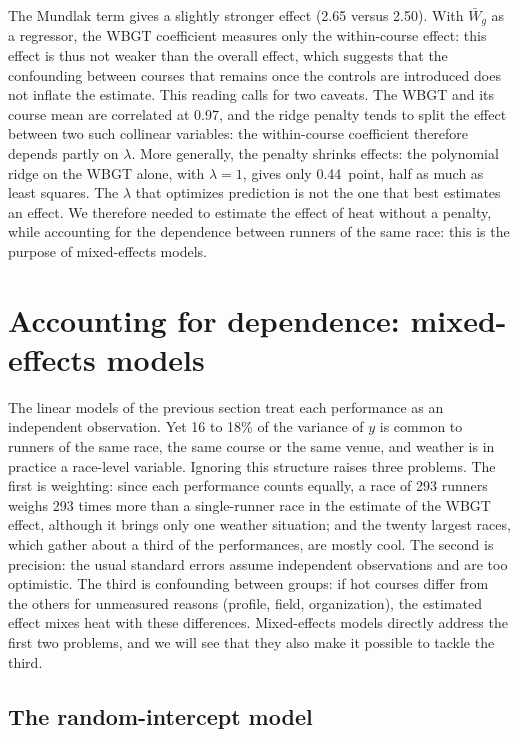 \documentclass[11pt,a4paper]{article}
\begin{document}
The Mundlak term gives a slightly stronger effect (2.65 versus 2.50). With $\bar W_g$ as a regressor, the WBGT
coefficient measures only the within-course effect: this effect is thus not weaker than the overall effect, which
suggests that the confounding between courses that remains once the controls are introduced does not inflate the
estimate. This reading calls for two caveats. The WBGT and its course mean are correlated at 0.97, and the ridge
penalty tends to split the effect between two such collinear variables: the within-course coefficient therefore
depends partly on $\lambda$. More generally, the penalty shrinks effects: the polynomial ridge on the WBGT alone, with
$\lambda = 1$, gives only 0.44~point, half as much as least squares. The $\lambda$ that optimizes prediction is not the
one that best estimates an effect. We therefore needed to estimate the effect of heat without a penalty, while
accounting for the dependence between runners of the same race: this is the purpose of mixed-effects models.

\section{Accounting for dependence: mixed-effects models}\label{sec:mixed}

The linear models of the previous section treat each performance as an independent observation. Yet 16 to 18\% of the
variance of $y$ is common to runners of the same race, the same course or the same venue, and weather is in practice
a race-level variable. Ignoring this structure raises three problems. The first is weighting: since each performance
counts equally, a race of 293 runners weighs 293 times more than a single-runner race in the estimate of the WBGT
effect, although it brings only one weather situation; and the twenty largest races, which gather about a third of
the performances, are mostly cool. The second is precision: the usual standard errors assume independent
observations and are too optimistic. The third is confounding between groups: if hot courses differ from the others
for unmeasured reasons (profile, field, organization), the estimated effect mixes heat with these differences.
Mixed-effects models directly address the first two problems, and we will see that they also make it possible to
tackle the third.

\subsection{The random-intercept model}\label{sec:random_intercept}
\end{document}
